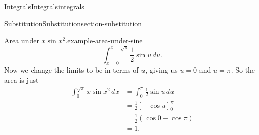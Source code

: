 \documentclass[oneside,10pt,]{book}
\numberwithin{equation}{section}
\begin{document}
\begin{chapterptx}{Integrals}{}{Integrals}{}{}{integrals}
\begin{sectionptx}{Substitution}{}{Substitution}{}{}{section-substitution}
\begin{example}{Area under \(x\sin x^{2}\).}{example-area-under-sine}
\begin{equation*}
\int_{x=0}^{x=\sqrt{\pi}}\frac{1}{2}\sin u\,du.
\end{equation*}
Now we change the limits to be in terms of \(u\), giving us \(u = 0\) and \(u = \pi\). So the area is just%
\begin{align*}
\int_{0}^{\sqrt{\pi}}x\sin x^{2}\,dx & = \int_{0}^{\pi}\frac{1}{2}\sin u\,du \\
& = \frac{1}{2}[-\cos u]_{0}^{\pi} \\
& = \frac{1}{2}(\cos0 - \cos\pi) \\
& = 1. 
\end{align*}
%
\end{example}
\end{sectionptx}
\end{chapterptx}
%
%
\typeout{************************************************}
\typeout{************************************************}
%
\end{document}
